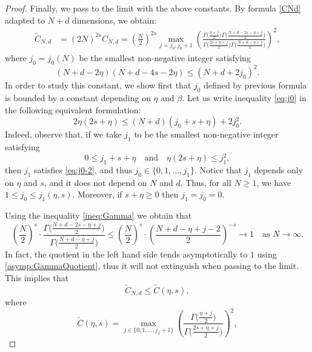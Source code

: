 \documentclass[11pt, twoside, notitlepage]{amsart}
\numberwithin{equation}{section}
\begin{document}
\begin{proof}
Finally, we pass to the limit with the above constants. By formula \eqref{CNd} adapted to $N+d$ dimensions, we obtain:
\begin{align*}
   \widetilde{C}_{N,d} & = (2N )^{2s}  C_{N,d} = \left(\frac{N}{2}\right) ^{2s}    \max_{j=j_0, j_0+1} \left(  \frac{ \Gamma\big( \frac{\eta+j}{2} \big)   \Gamma\big( \frac{N+d-2s-\eta+j}{2} \big)   }
{ \Gamma\big( \frac{2s+\eta+j}{2} \big)   \Gamma\big( \frac{N+d-\eta+j}{2} \big)   } \right)^2,
\end{align*}
where $j_0=j_0(N)$ be the smallest non-negative integer satisfying
\begin{equation}\label{eq:j0}
(N+d - 2\eta )( N+d-4s-2\eta ) \le (N+d + 2j_0)^2.
\end{equation}
In order to study this constant, we show  first that $j_0$ defined by previous formula is bounded by a constant depending on $\eta$ and $\beta$. Let us write inequality \eqref{eq:j0} in the following equivalent formulation:
\begin{equation}\label{eq:j0-2}
 2 \eta(2s+\eta) \le (N+d) ( j_0 + s + \eta) + 2 j_0^2.
\end{equation}
 Indeed, observe that, if we take $j_1$ to be the smallest non-negative integer satisfying
$$0\le j_1 + s + \eta  \quad  \text{and}  \quad    \eta(2s+\eta) \le   j_1^2 ,  $$
then $j_1$ satisfies \eqref{eq:j0-2}, and thus $j_0 \in \{ 0,1,\dots, j_1 \}$. Notice that $j_1$ depends only on $\eta$ and $s$, and it does not depend on $N$ and $d$.
Thus, for all $N\ge 1$, we have $1\le j_0\le j_1(\eta,s)$.
Moreover, if $s+\eta \ge 0$ then $j_1 =j_0=0$.

Using the inequality \eqref{ineq:Gamma} we obtain that
$$ \left(\frac{N}{2}\right) ^{s} \cdot  \frac{    \Gamma\big( \frac{N+d-2s-\eta+j}{2} \big)   }
{   \Gamma\big( \frac{N+d-\eta+j}{2} \big)   }
\le\left(\frac{N}{2}\right) ^{s} \cdot  \left(   \frac{N+d-\eta+j-2}{2} \right)^{-s}   \to  1 \quad \text{as }N \to \infty.
$$
In fact, the quotient in the left hand side tends asymptotically to $1$ using \eqref{asymp:GammaQuotient}, thus it will not extinguish when passing to the limit. This implies that
$$ \widetilde{C}_{N,d}  \le    \widetilde{C}(\eta,s), $$
where
$$
\widetilde{C}(\eta,s) = \max_{j \in \{ 0,1,\dots, j_1+1 \}} \left(  \frac{ \Gamma\big( \frac{\eta+j}{2} \big)   }
{ \Gamma\big( \frac{2s+\eta+j}{2} \big)} \right)^2,$$



\end{proof}
\end{document}
